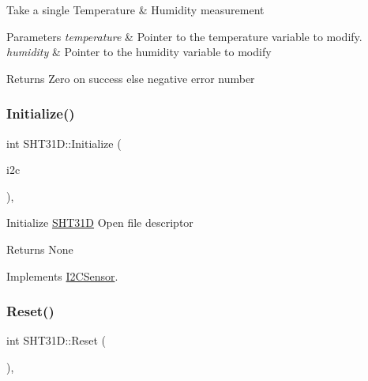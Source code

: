 Take a single Temperature \& Humidity measurement


\begin{DoxyParams}{Parameters}
{\em temperature} & Pointer to the temperature variable to modify. \\
\hline
{\em humidity} & Pointer to the humidity variable to modify\\
\hline
\end{DoxyParams}
\begin{DoxyReturn}{Returns}
Zero on success else negative error number 
\end{DoxyReturn}
\mbox{\label{classSHT31D_af3ec39a4f04344a1b422761cc904343e}} 
\subsubsection{\texorpdfstring{Initialize()}{Initialize()}}
{\footnotesize\ttfamily int S\+H\+T31\+D\+::\+Initialize (\begin{DoxyParamCaption}\item[{\hyperlink{classI2CDriver}{I2\+C\+Driver} \&}]{i2c }\end{DoxyParamCaption})\hspace{0.3cm}{\ttfamily [override]}, {\ttfamily [virtual]}}

Initialize \hyperlink{classSHT31D}{S\+H\+T31D} Open file descriptor

\begin{DoxyReturn}{Returns}
None 
\end{DoxyReturn}


Implements \hyperlink{classI2CSensor_a0fb4755ddff3fe2cf5a9651d9d1fe5cd}{I2\+C\+Sensor}.

\mbox{\label{classSHT31D_aa5d28c2557ed05435ca9b433492b9b07}} 
\subsubsection{\texorpdfstring{Reset()}{Reset()}}
{\footnotesize\ttfamily int S\+H\+T31\+D\+::\+Reset (\begin{DoxyParamCaption}\item[{void}]{ }\end{DoxyParamCaption})\hspace{0.3cm}{\ttfamily [override]}, {\ttfamily [virtual]}}

